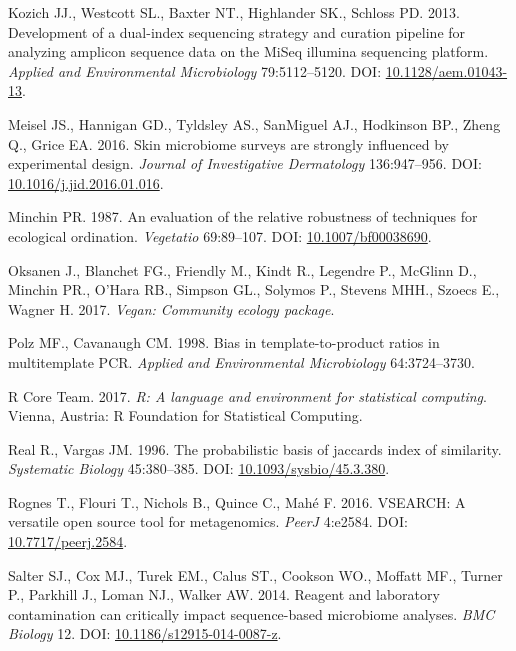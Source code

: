 \documentclass[11pt,]{article}
\begin{document}
\hypertarget{ref-protocol_Kozich_2013}{}
Kozich JJ., Westcott SL., Baxter NT., Highlander SK., Schloss PD. 2013.
Development of a dual-index sequencing strategy and curation pipeline
for analyzing amplicon sequence data on the MiSeq illumina sequencing
platform. \emph{Applied and Environmental Microbiology} 79:5112--5120.
DOI: \href{https://doi.org/10.1128/aem.01043-13}{10.1128/aem.01043-13}.

\hypertarget{ref-Meisel2016}{}
Meisel JS., Hannigan GD., Tyldsley AS., SanMiguel AJ., Hodkinson BP.,
Zheng Q., Grice EA. 2016. Skin microbiome surveys are strongly
influenced by experimental design. \emph{Journal of Investigative
Dermatology} 136:947--956. DOI:
\href{https://doi.org/10.1016/j.jid.2016.01.016}{10.1016/j.jid.2016.01.016}.

\hypertarget{ref-bc_index_Minchin1987}{}
Minchin PR. 1987. An evaluation of the relative robustness of techniques
for ecological ordination. \emph{Vegetatio} 69:89--107. DOI:
\href{https://doi.org/10.1007/bf00038690}{10.1007/bf00038690}.

\hypertarget{ref-vegan_citation}{}
Oksanen J., Blanchet FG., Friendly M., Kindt R., Legendre P., McGlinn
D., Minchin PR., O'Hara RB., Simpson GL., Solymos P., Stevens MHH.,
Szoecs E., Wagner H. 2017. \emph{Vegan: Community ecology package}.

\hypertarget{ref-polz_bias_1998}{}
Polz MF., Cavanaugh CM. 1998. Bias in template-to-product ratios in
multitemplate PCR. \emph{Applied and Environmental Microbiology}
64:3724--3730.

\hypertarget{ref-r_citation_2017}{}
R Core Team. 2017. \emph{R: A language and environment for statistical
computing}. Vienna, Austria: R Foundation for Statistical Computing.

\hypertarget{ref-Real1996}{}
Real R., Vargas JM. 1996. The probabilistic basis of jaccards index of
similarity. \emph{Systematic Biology} 45:380--385. DOI:
\href{https://doi.org/10.1093/sysbio/45.3.380}{10.1093/sysbio/45.3.380}.

\hypertarget{ref-vsearch_Rognes_2016}{}
Rognes T., Flouri T., Nichols B., Quince C., Mahé F. 2016. VSEARCH: A
versatile open source tool for metagenomics. \emph{PeerJ} 4:e2584. DOI:
\href{https://doi.org/10.7717/peerj.2584}{10.7717/peerj.2584}.

\hypertarget{ref-contamination_Salter2014}{}
Salter SJ., Cox MJ., Turek EM., Calus ST., Cookson WO., Moffatt MF.,
Turner P., Parkhill J., Loman NJ., Walker AW. 2014. Reagent and
laboratory contamination can critically impact sequence-based microbiome
analyses. \emph{BMC Biology} 12. DOI:
\href{https://doi.org/10.1186/s12915-014-0087-z}{10.1186/s12915-014-0087-z}.
\end{document}
